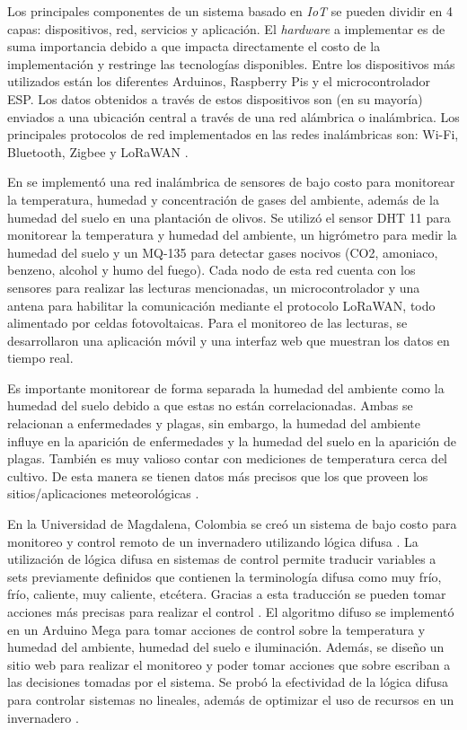 Los principales componentes de un sistema basado en \textit{IoT} se pueden dividir en 4 capas: dispositivos, red, servicios y aplicación. 
El \textit{hardware} a implementar es de suma importancia debido a que impacta directamente el costo de la implementación y restringe 
las tecnologías disponibles. Entre los dispositivos más utilizados están los diferentes Arduinos, Raspberry Pis y el microcontrolador ESP. 
Los datos obtenidos a través de estos dispositivos son (en su mayoría) enviados a una ubicación central a través de una red alámbrica o inalámbrica.
Los principales protocolos de red implementados en las redes inalámbricas son: Wi-Fi, Bluetooth, Zigbee y LoRaWAN \cite{systematicreviewiot}. 

En \cite{olive_orchard_monitorization} se implementó una red inalámbrica de sensores de bajo costo para monitorear la temperatura, humedad y concentración de gases 
del ambiente, además de la humedad del suelo en una plantación de olivos. Se utilizó el sensor DHT 11 para monitorear la temperatura y humedad del ambiente, un
higrómetro para medir la humedad del suelo y un MQ-135 para detectar gases nocivos (CO2, amoniaco, benzeno, alcohol y humo del fuego). Cada nodo de esta 
red cuenta con los sensores para realizar las lecturas mencionadas, un microcontrolador y una antena para habilitar la comunicación mediante el protocolo 
LoRaWAN, todo alimentado por celdas fotovoltaicas. Para el monitoreo de las lecturas, se desarrollaron una aplicación móvil y una interfaz web que 
muestran los datos en tiempo real.

Es importante monitorear de forma separada la humedad del ambiente como la humedad del suelo debido a que estas no están correlacionadas. Ambas se relacionan
a enfermedades y plagas, sin embargo, la humedad del ambiente influye en la aparición de enfermedades y la humedad del suelo en la aparición de plagas. También
es muy valioso contar con mediciones de temperatura cerca del cultivo. De esta manera se tienen datos más precisos que los que proveen los sitios/aplicaciones 
meteorológicas \cite{olive_orchard_monitorization}.

En la Universidad de Magdalena, Colombia se creó un sistema de bajo costo para monitoreo y control remoto de un invernadero utilizando lógica difusa 
\cite{low_cost_fuzzy_logic_greenhouse}. La utilización de lógica difusa en sistemas de control permite traducir variables a sets previamente definidos que contienen la 
terminología difusa como muy frío, frío, caliente, muy caliente, etcétera. Gracias a esta traducción se pueden tomar acciones más precisas para realizar el 
control \cite{agriculture_automation_review}. El algoritmo difuso se implementó en un Arduino Mega para tomar acciones de control sobre la temperatura y humedad 
del ambiente, humedad del suelo e iluminación. Además, se diseño un sitio web para realizar el monitoreo y poder tomar acciones que sobre escriban a las decisiones 
tomadas por el sistema. Se probó la efectividad de la lógica difusa para controlar sistemas no lineales, además de optimizar el uso de recursos en un 
invernadero \cite{low_cost_fuzzy_logic_greenhouse}.

